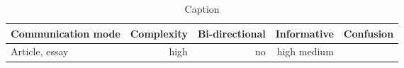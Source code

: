 \begin{table*}\centering
{}
\begin{tabular}{@{}lrrrr@{}}\toprule
Communication mode & Complexity & Bi-directional & Informative  & Confusion
\\\midrule
Article, essay & high & no &high
medium
 \\

\bottomrule
\end{tabular}
\caption{Caption}
\end{table*}